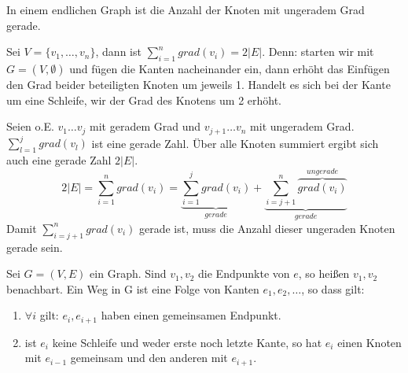 \begin{bemerkung}
    In einem endlichen Graph ist die Anzahl der Knoten mit ungeradem Grad gerade.
\end{bemerkung}


\begin{beweis}
    Sei $V = \{ v_1, \dots, v_n \}$, dann ist $\sum_{i=1}^n grad(v_i) = 2 |E|$.
    Denn: starten wir mit $G = (V, \emptyset)$ und fügen die Kanten
    nacheinander ein, dann erhöht das Einfügen den Grad beider beteiligten
    Knoten um jeweils 1. Handelt es sich bei der Kante um eine Schleife, wir
    der Grad des Knotens um 2 erhöht.
    
    Seien o.E. $v_1 \dots v_j$ mit geradem Grad und $v_{j+1} \dots v_n$ mit
    ungeradem Grad. $\sum_{l=1}^j grad(v_l)$ ist eine gerade Zahl. Über alle
    Knoten summiert ergibt sich auch eine gerade Zahl $2|E|$.  $$ 2|E|
    = \sum_{i=1}^n grad(v_i) = \underbrace{\sum_{i=1}^j grad(v_i)}_{gerade}
    + \underbrace{\sum_{i=j+1}^n \overbrace{grad(v_i)}^{ungerade}}_{gerade} $$
    Damit $\sum_{i=j+1}^n grad(v_i)$ gerade ist, muss die Anzahl dieser
    ungeraden Knoten gerade sein.
\end{beweis}


\begin{definition}
    
    Sei $G = (V,E)$ ein Graph. Sind $v_1, v_2$ die Endpunkte von $e$, so heißen
    $v_1, v_2$ benachbart. Ein Weg in G ist eine Folge von Kanten $e_1, e_2,
    \dots$, so dass gilt:
    \begin{enumerate}
        \item $\forall i$ gilt: $e_i, e_{i+1}$ haben einen gemeinsamen Endpunkt.
        \item ist $e_i$ keine Schleife und weder erste noch letzte Kante, so
            hat $e_i$ einen Knoten mit $e_{i-1}$ gemeinsam und den anderen mit
            $e_{i+1}$.
    \end{enumerate}
\end{definition}    


